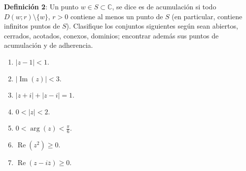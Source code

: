 \documentclass[11pt]{article}
\begin{document}
\begin{enumerate}
    \textbf{Definición 2}: Un punto $w \in S \subset \mathbb{C}$, se dice es de acumulación si todo $D(w; r) \setminus \{w\}$, $r > 0$ contiene al menos un punto de $S$ (en particular, contiene infinitos puntos de $S$). Clasifique los conjuntos siguientes según sean abiertos, cerrados, acotados, conexos, dominios; encontrar además sus puntos de acumulación y de adherencia.
    \begin{enumerate}
        \item $|z - 1| < 1$.

        

        \item $|\operatorname{Im}(z)| < 3$.
        


        \item $|z + i| + |z - i| = 1$.



        \item $0 < |z| < 2$.
        


        \item $0 < \arg(z) < \frac{\pi}{6}$.
        


        \item $\operatorname{Re}(z^2) \geq 0$.
        


        \item $\operatorname{Re}(z - i \overline{z}) \geq 0$.
    \end{enumerate}
\end{enumerate}
\end{document}
